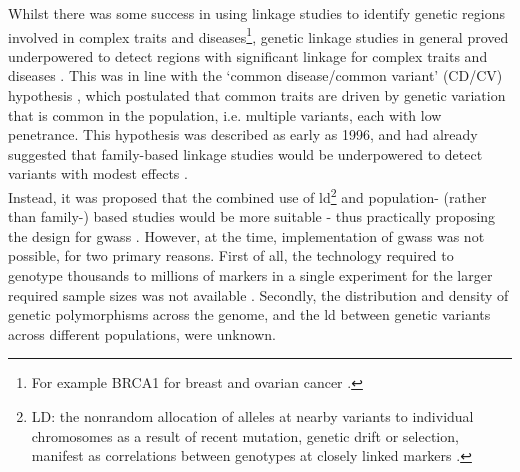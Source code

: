Whilst there was some success in using linkage studies to identify genetic regions involved in complex traits and diseases\footnote{For example BRCA1 for breast and ovarian cancer  \cite{bailey2011linkage, miki1994strong}.},
genetic linkage studies in general proved underpowered to detect regions with significant linkage for complex traits and diseases \cite{bush2012genome, altmuller2001genomewide}. 
This was in line with the `common disease/common variant' (CD/CV) hypothesis \cite{bush2012genome, reich2001allelic}, which postulated that common traits are driven by genetic variation that is common in the population, i.e. multiple variants, each with low penetrance.
This hypothesis was described as early as 1996, and had already suggested that family-based linkage studies would be underpowered to detect variants with modest effects \cite{risch1996future}. \\

Instead, it was proposed that the combined use of \gls{ld}\footnote{LD: the nonrandom allocation of alleles at nearby variants to individual chromosomes as a result of recent mutation, genetic drift or selection, manifest as correlations between genotypes at closely linked markers \cite{mccarthy2008genome}. 
} and population- (rather than family-) based studies would be more suitable \cite{risch1996future, jorde2000linkage} - thus practically proposing the design for \glspl{gwas} \cite{risch1996future}.
However, at the time, implementation of \glspl{gwas} was not possible, for two primary reasons.
First of all, the technology required to genotype thousands to millions of markers in a single experiment for the larger required sample sizes was not available \cite{risch1996future, visscher2012five}.
Secondly, the distribution and density of genetic polymorphisms across the genome, and the \gls{ld} between genetic variants across different populations, were unknown.\\

